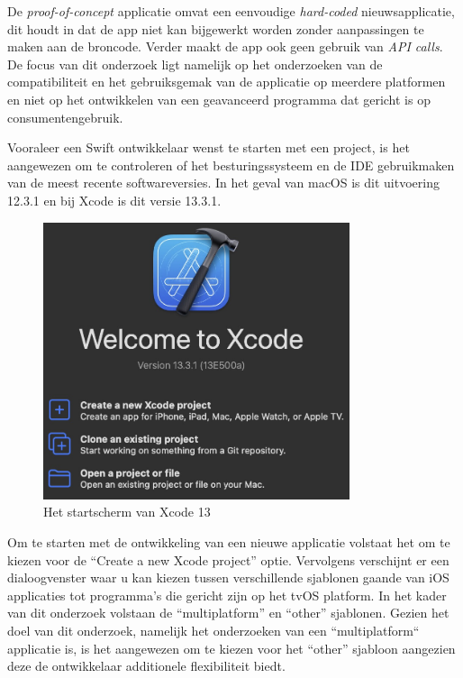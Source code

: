 De \textit{proof-of-concept} applicatie omvat een eenvoudige \textit{hard-coded} nieuwsapplicatie, dit houdt in dat de app niet kan bijgewerkt  worden zonder aanpassingen te maken aan de broncode. Verder maakt de app ook geen gebruik van \textit{API calls}. De focus van dit onderzoek ligt namelijk op het onderzoeken van de compatibiliteit en het gebruiksgemak van de applicatie op meerdere platformen en niet op het ontwikkelen van een geavanceerd programma dat gericht is op consumentengebruik.

Vooraleer een Swift ontwikkelaar wenst te starten met een project, is het aangewezen om te controleren of het besturingssysteem en de IDE gebruikmaken van de meest recente softwareversies. In het geval van macOS is dit uitvoering 12.3.1 en bij Xcode is dit versie 13.3.1.

\begin{figure}[!h]
    \centering
    \includegraphics[width=90mm, scale=0.7]{img/xcodeversie.jpeg}
    \caption{Het startscherm van Xcode 13}
\end{figure}

Om te starten met de ontwikkeling van een nieuwe applicatie volstaat het om te kiezen voor de “Create a new Xcode project” optie. Vervolgens verschijnt er een dialoogvenster waar u kan kiezen tussen verschillende sjablonen gaande van iOS applicaties tot programma’s die gericht zijn op het tvOS platform. In het kader van dit onderzoek volstaan de “multiplatform” en “other” sjablonen. Gezien het doel van dit onderzoek, namelijk het onderzoeken van een “multiplatform“ applicatie is, is het aangewezen om te kiezen voor het “other” sjabloon aangezien deze de ontwikkelaar additionele flexibiliteit biedt.

